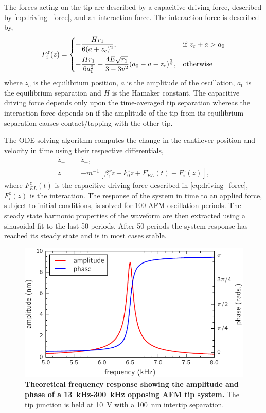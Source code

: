 \documentclass{article}
\begin{document}
The forces acting on the tip are described by a capacitive driving force, described by \eqref{eq:driving_force}, and an interaction force. The interaction force is described by,
\begin{equation}
F_i^z(z) =
\begin{dcases}
-\frac{H r_1}{6(a+z_c)^2}, & \text{if } z_c + a > a_0 \\
-\frac{H r_1}{6a_0^2} + \frac{4E\sqrt{r_1}}{3 - 3v^2} (a_0-a-z_c)^{\frac{3}{2}}, & \text{otherwise}
\end{dcases}
\end{equation}
where $z_c$ is the equilibrium position, $a$ is the amplitude of the oscillation, $a_0$ is the equilibrium separation and $H$ is the Hamaker constant.
The capacitive driving force depends only upon the time-averaged tip separation whereas the interaction force depends on if the amplitude of the tip from its equilibrium separation causes contact/tapping with the other tip.

The ODE solving algorithm computes the change in the cantilever position and velocity in time using their respective differentials,
\begin{align}
\dot{z}_+ &= \dot{z}_-, \\
\ddot{z} &= -m^{-1}\left[\beta_1^z\dot{z} - k_0^zz + F_{EL}^z(t) + F_i^z(z)\right],
\end{align}
where $F_{EL}^z(t)$ is the capacitive driving force described in \eqref{eq:driving_force}, $F_i^z(z)$ is the interaction.
The response of the system in time to an applied force, subject to initial conditions, is solved for 100 AFM oscillation periods. The steady state harmonic properties of the waveform are then extracted using a sinusoidal fit to the last 50 periods. After 50 periods the system response has reached its steady state and is in most cases stable.

\begin{figure}[h]
\centering
\includegraphics{figures/afm_theory_frequency_response}
\caption[Theoretical frequency response showing the amplitude and phase of a \SI{13}{kHz}-\SI{300}{kHz} opposing AFM tip system]{\textbf{Theoretical frequency response showing the amplitude and phase of a \SI{13}{kHz}-\SI{300}{kHz} opposing AFM tip system.} The tip junction is held at \SI{10}{V} with a \SI{100}{nm} intertip separation.}
\label{fig:num_freq_resp}
\end{figure}
\end{document}
